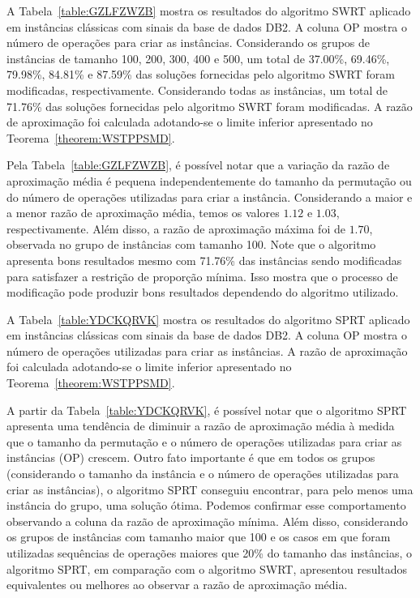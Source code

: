 A Tabela~\ref{table:GZLFZWZB} mostra os resultados do algoritmo SWRT aplicado em instâncias clássicas com sinais da base de dados DB2. A coluna OP mostra o número de operações para criar as instâncias. Considerando os grupos de instâncias de tamanho 100, 200, 300, 400 e 500, um total de 37.00\%, 69.46\%, 79.98\%, 84.81\% e 87.59\% das soluções fornecidas pelo algoritmo SWRT foram modificadas, respectivamente. Considerando todas as instâncias, um total de 71.76\% das soluções fornecidas pelo algoritmo SWRT foram modificadas. A razão de aproximação foi calculada adotando-se o limite inferior apresentado no Teorema~\ref{theorem:WSTPPSMD}.



Pela Tabela~\ref{table:GZLFZWZB}, é possível notar que a variação da razão de aproximação média é pequena independentemente do tamanho da permutação ou do número de operações utilizadas para criar a instância. Considerando a maior e a menor razão de aproximação média, temos os valores $1.12$ e $1.03$, respectivamente. Além disso, a razão de aproximação máxima foi de $1.70$, observada no grupo de instâncias com tamanho 100. Note que o algoritmo apresenta bons resultados mesmo com 71.76\% das instâncias sendo modificadas para satisfazer a restrição de proporção mínima. Isso mostra que o processo de modificação pode produzir bons resultados dependendo do algoritmo utilizado.


A Tabela~\ref{table:YDCKQRVK} mostra os resultados do algoritmo SPRT aplicado em instâncias clássicas com sinais da base de dados DB2. A coluna OP mostra o número de operações utilizadas para criar as instâncias. A razão de aproximação foi calculada adotando-se o limite inferior apresentado no Teorema~\ref{theorem:WSTPPSMD}.



A partir da Tabela~\ref{table:YDCKQRVK}, é possível notar que o algoritmo SPRT apresenta uma tendência de diminuir a razão de aproximação média à medida que o tamanho da permutação e o número de operações utilizadas para criar as instâncias (OP) crescem. Outro fato importante é que em todos os grupos (considerando o tamanho da instância e o número de operações utilizadas para criar as instâncias), o algoritmo SPRT conseguiu encontrar, para pelo menos uma instância do grupo, uma solução ótima. Podemos confirmar esse comportamento observando a coluna da razão de aproximação mínima. Além disso, considerando os grupos de instâncias com tamanho maior que 100 e os casos em que foram utilizadas sequências de operações maiores que 20\% do tamanho das instâncias, o algoritmo SPRT, em comparação com o algoritmo SWRT, apresentou resultados equivalentes ou melhores ao observar a razão de aproximação média.

